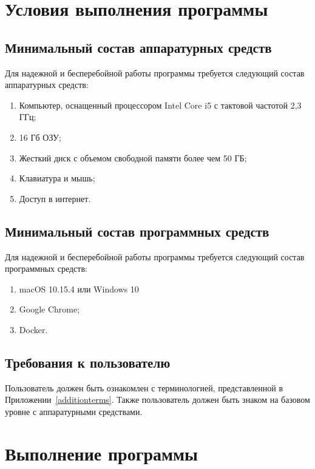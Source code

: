 \documentclass[a4paper,12pt,reqno]{article}
\begin{document}
\section{Условия выполнения программы}

\subsection{Минимальный состав аппаратурных средств}

Для надежной и бесперебойной работы программы требуется следующий состав аппаратурных средств:

\begin{enumerate}
    \item Компьютер, оснащенный процессором Intel Core i5 с тактовой частотой 2,3 ГГц;
    \item 16 Гб ОЗУ;
    \item Жесткий диск с объемом свободной памяти более чем 50 ГБ;
    \item Клавиатура и мышь;
    \item Доступ в интернет.
\end{enumerate}

\subsection{Минимальный состав программных средств}

Для надежной и бесперебойной работы программы требуется следующий состав программных средств:
\begin{enumerate}
    \item macOS 10.15.4 или Windows 10 
    \item Google Chrome;
    \item Docker.
\end{enumerate}

\subsection{Требования к пользователю}

Пользователь должен быть ознакомлен с терминологией, представленной в Приложении~\ref{additionterms}. Также пользователь должен быть знаком на базовом уровне с аппаратурными средствами.

\section{Выполнение программы}
\end{document}
